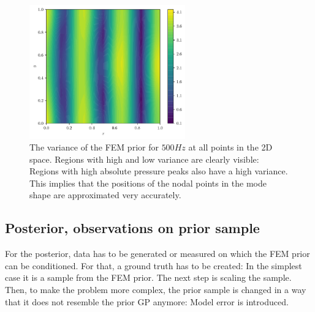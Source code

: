\documentclass[%
  a4paper,oneside,%
  11pt,%
  smallchapters,
  style=printdev,
  extramargin,
  green,%
  rgb, <cmyk>
  ]{tubsbook}
\begin{document}
\begin{figure}[!ht]
\includegraphics[width=0.6\textwidth]{pics/VarField.pdf}
\centering
\caption{The variance of the FEM prior for $500Hz$ at all points in the 2D space. Regions with high and low variance are clearly visible: Regions with high absolute pressure peaks also have a high variance. This implies that the positions of the nodal points in the mode shape are approximated very accurately.}
\label{fig:varFieldPrior}
\end{figure}
%
%
%
%


\subsection{Posterior, observations on prior sample}
For the posterior, data has to be generated or measured on which the FEM prior can be conditioned. For that, a ground truth has to be created: In the simplest case it is a sample from the FEM prior. The next step is scaling the sample. Then, to make the problem more complex, the prior sample is changed in a way that it does not resemble the prior GP anymore: Model error is introduced.
\end{document}
